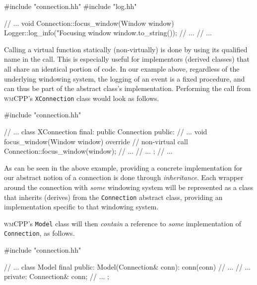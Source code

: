 
\begin{cppblock}
  #include "connection.hh"
  #include "log.hh"

  // ...
  void
  Connection::focus_window(Window window)
  {
    Logger::log_info("Focusing window %
      window.to_string());
    // ...
  }
  // ...
\end{cppblock}

Calling  a virtual  function statically  (non-virtually)  is done  by using  its
qualified name in the call. This  is especially useful for implementors (derived
classes) that  all share  an identical  portion of code.  In our  example above,
regardless of  the underlying  windowing system,  the logging of  an event  is a
fixed procedure,  and can thus be  part of the abstract  class's implementation.
Performing  the call  from \textsc{wmCPP}'s  \texttt{XConnection} class
would look as follows.

\begin{cppblock}
  #include "connection.hh"

  // ...
  class XConnection final: public Connection
  {
  public:
    // ...
    void focus_window(Window window) override {
      // non-virtual call
      Connection::focus_window(window);
      // ...
    }
    // ...
  };
  // ...
\end{cppblock}

As can  be seen in  the above example,  providing a concrete  implementation for
our  abstract  notion of  a  connection  is done  through  \textit{inheritance}.
Each  wrapper   around  the  connection  with   \textit{some}  windowing  system
will   be  represented   as   a   class  that   inherits   (derives)  from   the
\texttt{Connection}   abstract  class,   providing  an   implementation
specific to that windowing system.

\textsc{wmCPP}'s  \texttt{Model}  class  will then  \textit{contain}  a
reference  to \textit{some}  implementation of  \texttt{Connection}, as
follows.

\begin{cppblock}
  #include "connection.hh"

  // ...
  class Model final
  {
  public:
    Model(Connection& conn): conn(conn) {
      // ...
    }
    // ...
  private:
    Connection& conn;
    // ...
  };
\end{cppblock}

